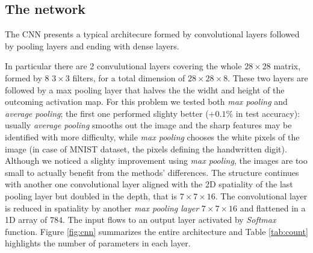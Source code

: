 \documentclass[compsoc]{IEEEtran}
\begin{document}
\subsection{The network}
The CNN presents a typical architecure formed by convolutional layers followed by pooling layers and ending with dense layers. \par
In particular there are 2 convulutional layers covering the whole $28 \times 28$ matrix, formed by 8 $3 \times 3$ filters, for a total dimension of $28 \times 28 \times 8$. These two layers are followed by a max pooling layer that halves the the widht and height of the outcoming activation map. For this problem we tested both \emph{max pooling} and \emph{average pooling}; the first one performed slighty better ($+0.1\%$ in test accuracy): usually \emph{average pooling} smooths out the image and  the sharp features may be identified with more difficulty, while \emph{max pooling} chooses the white pixels of the image (in case of MNIST dataset, the pixels defining the handwritten digit). Although we noticed a slighty improvement using \emph{max pooling}, the images are too small to actually benefit from the methods' differences.
The structure continues with another one convolutional layer aligned with the 2D spatiality of the last pooling layer but doubled in the depth, that is $7 \times 7 \times 16$. The convolutional layer is reduced in spatiality by another \emph{max pooling layer} $7 \times 7 \times 16$ and flattened in a 1D array of $784$. The input flows to an output layer activated by \emph{Softmax} function. Figure \ref{fig:cnn} summarizes the entire architecture and Table \ref{tab:count} highlights the number of parameters in each layer.
\end{document}

